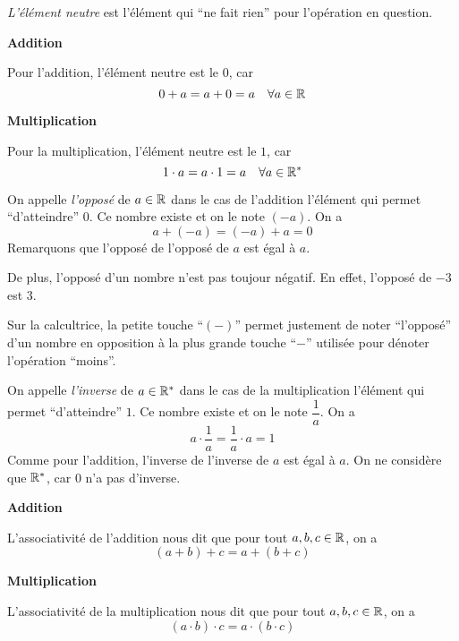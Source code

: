 \documentclass[a4paper,12pt]{report}
\begin{document}
\begin{description}[leftmargin= 2cm]
	\item[] 
		\emph{L'élément neutre} est l'élément qui \enquote{ne fait rien} pour l'opération en question.

		\begin{minipage}[t]{0.4\textwidth}{
		\vspace{0pt}
		{\bfseries Addition}

		Pour l'addition, l'élément neutre est le $0$, car
		\[0+a=a+0=a \quad \forall a\in \mathbb R\]
		}
		\end{minipage}
		\hfill
		\begin{minipage}[t]{0.4\textwidth}{
		\vspace{0pt}
		{\bfseries Multiplication}

		Pour la multiplication, l'élément neutre est le $1$, car
		\[1\cdot a=a\cdot 1=a \quad \forall a\in \mathbb R^*\]
		}
		\end{minipage}
	\item[]
		On appelle \emph{l'opposé} de $a\in \mathbb R$ dans le cas de l'addition l'élément qui permet \enquote{d'atteindre} $0$. Ce nombre existe et on le note $(-a)$. On a  
		\[a+(-a)=(-a)+a=0\]
		Remarquons que l'opposé de l'opposé de $a$ est égal à $a$. 

		De plus, l'opposé d'un nombre n'est pas toujour négatif. En effet, l'opposé de $-3$ est $3$.

		Sur la calcultrice, la petite touche \enquote{$(-)$} permet justement de noter \enquote{l'opposé} d'un nombre en opposition à la plus grande touche \enquote{$-$} utilisée pour dénoter l'opération \enquote{moins}.
	\item[]
		On appelle \emph{l'inverse} de $a\in \mathbb R^*$ dans le cas de la multiplication l'élément qui permet \enquote{d'atteindre} $1$. Ce nombre existe et on le note $\dfrac{1}{a}$. On a 
		\[a\cdot \dfrac{1}{a}=\dfrac{1}{a}\cdot a=1\]
		Comme pour l'addition, l'inverse de l'inverse de $a$ est égal à $a$. On ne considère que $\mathbb R^*$, car $0$ n'a pas d'inverse.
	\item[Associativité]

		\begin{minipage}[t]{0.4\textwidth}{
		\vspace{0pt}
		{\bfseries Addition}

		L'associativité de l'addition nous dit que pour tout $a,b,c\in \mathbb R$, on a 
		\[(a+b)+c=a+(b+c)\]
				}
		\end{minipage}
		\hfill
		\begin{minipage}[t]{0.4\textwidth}{
		\vspace{0pt}
		{\bfseries Multiplication}

	L'associativité de la multiplication nous dit que pour tout $a,b,c\in \mathbb R$, on a 
	\[(a\cdot b)\cdot c=a\cdot(b\cdot c)\]
		}
		\end{minipage}
	\item[Commutativité]


\end{description}
\end{document}

